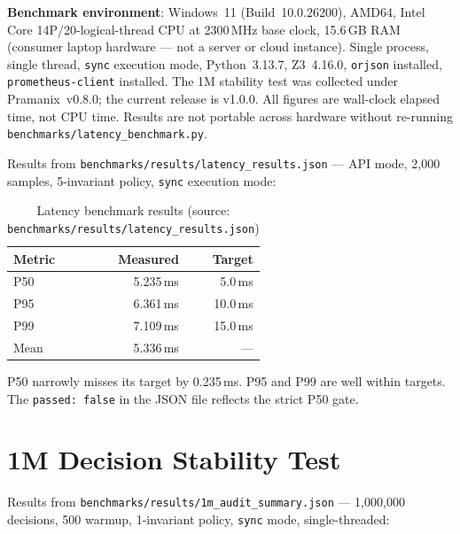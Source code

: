\documentclass[12pt,a4paper,oneside]{report}
\newcommand{\fname}[1]{\texttt{#1}}          %
\newcommand{\code}[1]{\texttt{#1}}           %
\begin{document}
\textbf{Benchmark environment}: Windows~11 (Build~10.0.26200), AMD64,
Intel Core 14P/20-logical-thread CPU at 2300\,MHz base clock, 15.6\,GB RAM
(consumer laptop hardware --- not a server or cloud instance).  Single
process, single thread, \code{sync} execution mode, Python~3.13.7,
Z3~4.16.0, \code{orjson} installed, \code{prometheus-client} installed.
The 1M stability test was collected under Pramanix~v0.8.0; the current
release is v1.0.0.  All figures are wall-clock elapsed time, not CPU time.
Results are not portable across hardware without re-running
\fname{benchmarks/latency\_benchmark.py}.

Results from \fname{benchmarks/results/latency\_results.json} --- API mode,
2,000 samples, 5-invariant policy, \code{sync} execution mode:

\begin{table}[h]
\centering
\begin{tabular}{@{} l r r @{}}
\toprule
\textbf{Metric} & \textbf{Measured} & \textbf{Target} \\
\midrule
P50  & 5.235\,ms & 5.0\,ms \\
P95  & 6.361\,ms & 10.0\,ms \\
P99  & 7.109\,ms & 15.0\,ms \\
Mean & 5.336\,ms & --- \\
\bottomrule
\end{tabular}
\caption{Latency benchmark results (source:
  \fname{benchmarks/results/latency\_results.json})}
\label{tab:latency}
\end{table}

P50 narrowly misses its target by 0.235\,ms. P95 and P99 are well within
targets. The \code{passed: false} in the JSON file reflects the strict P50
gate.

\section{1M Decision Stability Test}

Results from \fname{benchmarks/results/1m\_audit\_summary.json} ---
1,000,000 decisions, 500 warmup, 1-invariant policy, \code{sync} mode,
single-threaded:
\end{document}
